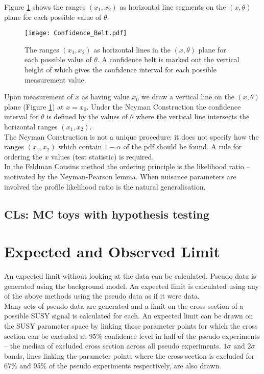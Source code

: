 Figure \ref{fig:Confidence_Belt} shows the ranges $\left(x_{1},x_{2}\right)$ as
horizontal line segments on the $\left(x,\theta\right)$ plane for each possible 
value of $\theta$. \\

\begin{figure}
\begin{center}
\texttt{[image: Confidence\_Belt.pdf]}
\caption{The ranges $\left(x_{1},x_{2}\right)$ as horizontal lines in the 
$\left(x,\theta\right)$ plane for each possible value of $\theta$. A
confidence belt is marked out the vertical height of which gives the
confidence interval for each possible measurement value.}
\label{fig:Confidence_Belt}
\end{center}
\end{figure}

Upon measurement of $x$ as having value $x_{0}$ we draw a vertical line on the 
$\left(x,\theta\right)$ plane (Figure \ref{fig:Confidence_Belt}) at $x = x_{0}$.
Under the Neyman Construction the confidence interval for $\theta$ is defined by
the values of $\theta$ where the vertical line intersects the horizontal ranges 
$\left(x_{1},x_{2}\right)$. \\

The Neyman Construction is not a unique procedure: it does not specify how the 
ranges $\left(x_{1},x_{2}\right)$ which contain $1 - \alpha$ of the pdf should
be found. A rule for ordering the $x$ values (test statistic) is required. \\

In the Feldman Cousins method the ordering principle is the likelihood ratio -- 
motivated by the Neyman-Pearson lemma. When nuisance parameters are involved the
profile likelihood ratio is the natural generalisation.

\subsection{CLs: MC toys with hypothesis testing}


\section{Expected and Observed Limit}

An expected limit without looking at the data can be calculated. Pseudo data is
generated using the background model. An expected limit is calculated using any
of the above methods using the pseudo data as if it were data. \\

Many sets of pseudo data are generated and a limit on the cross section of a 
possible SUSY signal is calculated for each. An expected limit can be drawn on 
the SUSY parameter space by linking those parameter points for which the cross 
section can be excluded at 95\% confidence level in half of the pseudo 
experiments -- the median of excluded cross section across all pseudo 
experiments. $1 \sigma$ and $2 \sigma$ bands, lines linking the parameter points
where the cross section is excluded for 67\% and 95\% of the pseudo experiments 
respectively, are also drawn.
